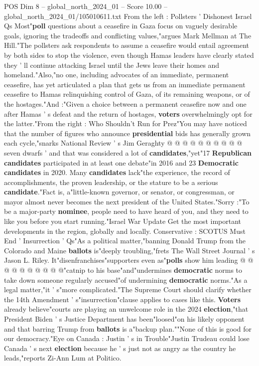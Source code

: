 \begin{textsample}{POS Dim 8 – global\_north\_2024\_01 – Score 10.00 – global\_north\_2024\_01/105010611.txt}  \label{ex:f8_pos_179}
From the left : Pollsters ' Dishonest Israel Qs Most"\textbf{poll} questions about a ceasefire in Gaza focus on vaguely desirable goals, ignoring the tradeoffs and conflicting values,"argues Mark Mellman at The Hill."The pollsters ask respondents to assume a ceasefire would entail agreement by both sides to stop the violence, even though Hamas leaders have clearly stated they ' ll continue attacking Israel until the Jews leave their homes and homeland."Also,"no one, including advocates of an immediate, permanent ceasefire, has yet articulated a plan that gets us from an immediate permanent ceasefire to Hamas relinquishing control of Gaza, of its remaining weapons, or of the hostages."And :"Given a choice between a permanent ceasefire now and one after Hamas ' s defeat and the return of hostages, \textbf{voters} overwhelmingly opt for the latter."From the right : Who Shouldn't Run for Prez"You may have noticed that the number of figures who announce \textbf{presidential} bids has generally grown each cycle,"snarks National Review ' s Jim Geraghty @ @ @ @ @ @ @ @ @ @ seven dwarfs ' and that was considered a lot of \textbf{candidates},"yet"17 \textbf{Republican} \textbf{candidates} participated in at least one debate"in 2016 and 23 \textbf{Democratic} \textbf{candidates} in 2020.
Many \textbf{candidates} lack"the experience, the record of accomplishments, the proven leadership, or the stature to be a serious \textbf{candidate}."Fact is, a"little-known governor, or senator, or congressman, or mayor almost never becomes the next president of the United States."Sorry :"To be a major-party \textbf{nominee}, people need to have heard of you, and they need to like you before you start running."Israel War Update Get the most important developments in the region, globally and locally.
Conservative : SCOTUS Must End ' Insurrection ' Qs"As a political matter,"banning Donald Trump from the Colorado and Maine \textbf{ballots} is"deeply troubling,"frets The Wall Street Journal ' s Jason L.
Riley.
It"disenfranchises"supporters even as"\textbf{polls} show him leading @ @ @ @ @ @ @ @ @ @"catnip to his base"and"undermines \textbf{democratic} norms to take down someone regularly accused"of undermining \textbf{democratic} norms."As a legal matter,"it ' s"more complicated."The Supreme Court should clarify whether the 14th Amendment ' s"insurrection"clause applies to cases like this. \textbf{Voters} already believe"courts are playing an unwelcome role in the 2024 \textbf{election},"that President Biden ' s Justice Department has been"loosed"on his likely opponent and that barring Trump from \textbf{ballots} is a"backup plan.""None of this is good for our democracy."Eye on Canada : Justin ' s in Trouble"Justin Trudeau could lose Canada ' s next \textbf{election} because he ' s just not as angry as the country he leads,"reports Zi-Ann Lum at Politico.

\end{textsample}
